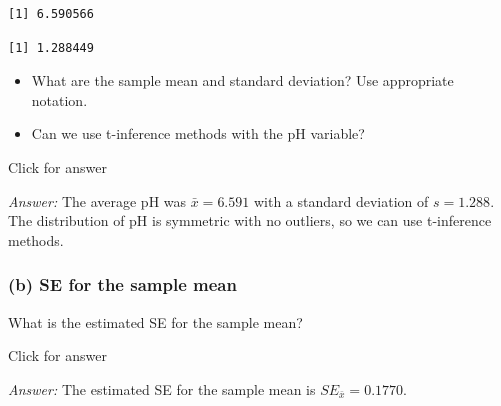 \documentclass[
]{book}
\newenvironment{Shaded}{\begin{snugshade}}{\end{snugshade}}
\newcommand{\DecValTok}[1]{\textcolor[rgb]{0.00,0.00,0.81}{#1}}
\newcommand{\FunctionTok}[1]{\textcolor[rgb]{0.00,0.00,0.00}{#1}}
\newcommand{\NormalTok}[1]{#1}
\newcommand{\SpecialCharTok}[1]{\textcolor[rgb]{0.00,0.00,0.00}{#1}}
\providecommand{\tightlist}{%
  \setlength{\itemsep}{0pt}\setlength{\parskip}{0pt}}
\begin{document}
\begin{Shaded}
\end{Shaded}

\begin{verbatim}
[1] 6.590566
\end{verbatim}

\begin{Shaded}
\end{Shaded}

\begin{verbatim}
[1] 1.288449
\end{verbatim}

\begin{itemize}
\tightlist
\item
  What are the sample mean and standard deviation? Use appropriate notation.
\item
  Can we use t-inference methods with the pH variable?
\end{itemize}

Click for answer

\emph{Answer:} The average pH was \(\bar{x} = 6.591\) with a standard deviation of \(s=1.288\). The distribution of pH is symmetric with no outliers, so we can use t-inference methods.

\hypertarget{b-se-for-the-sample-mean-1}{%
\subsubsection{(b) SE for the sample mean}\label{b-se-for-the-sample-mean-1}}

What is the estimated SE for the sample mean?

Click for answer

\emph{Answer:} The estimated SE for the sample mean is \(SE_{\bar{x}} = 0.1770\).

\begin{Shaded}
\end{Shaded}
\end{document}
